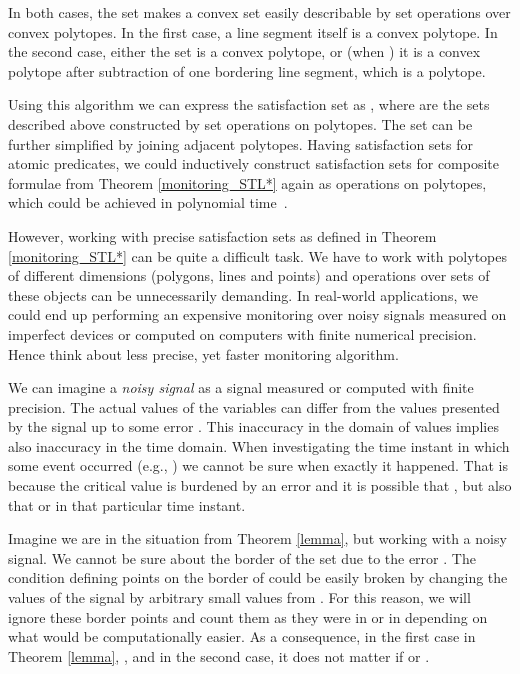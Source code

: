 In both cases, the set  makes a convex set easily describable by set operations over convex polytopes. In the first case, a line segment itself is a convex polytope. In the second case, either the set  is a convex polytope, or (when ) it is a convex polytope after subtraction of one bordering line segment, which is a polytope.

Using this algorithm we can express the satisfaction set  as , where  are the sets described above constructed by set operations on polytopes. The set  can be further simplified by joining adjacent polytopes. Having satisfaction sets for atomic predicates, we could inductively construct satisfaction sets for composite formulae from Theorem \ref{monitoring_STL*} again as operations on polytopes, which could be achieved in polynomial time~\cite{GeometricAlgorithms}. 

However, working with precise satisfaction sets as defined in Theorem \ref{monitoring_STL*} can be quite a difficult task. We have to work with polytopes of different dimensions (polygons, lines and points) and operations over sets of these objects can be unnecessarily demanding. In real-world applications, we could end up performing an expensive monitoring over noisy signals measured on imperfect devices or computed on computers with finite numerical precision. Hence think about less precise, yet faster monitoring algorithm.



We can imagine a \emph{noisy signal} as a signal measured or computed with finite precision. The actual values of the variables can differ from the values presented by the signal up to some error . This inaccuracy in the domain of values implies also inaccuracy in the time domain. When investigating the time instant in which some event occurred (e.g., ) we cannot be sure when exactly it happened. That is because the critical value  is burdened by an error and it is possible that , but also that  or  in that particular time instant.





Imagine we are in the situation from Theorem \ref{lemma}, but working with a noisy signal. We cannot be sure about the border of the set  due to the error . The condition  defining points on the border of  could be easily broken by changing the values of the signal  by arbitrary small values from . For this reason, we will ignore these border points and count them as they were in  or in  depending on what would be computationally easier. As a consequence, in the first case in Theorem \ref{lemma}, , and in the second case, it does not matter if  or .

